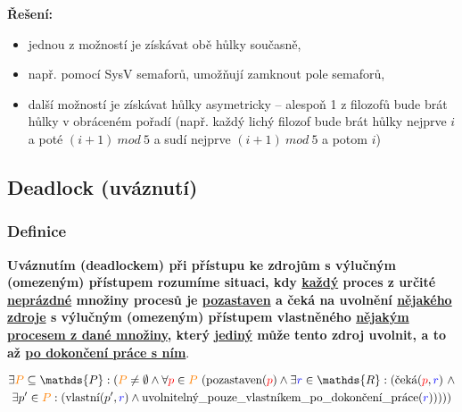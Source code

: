 \documentclass[a4paper, 11pt]{article}
\begin{document}
\textbf{Řešení:}
\begin{itemize}
    \item jednou z možností je získávat obě hůlky současně,
    \item např. pomocí SysV semaforů, umožňují zamknout pole semaforů,
    \item další možností je získávat hůlky asymetricky -- alespoň 1 z filozofů bude brát hůlky v obráceném pořadí (např. každý lichý filozof bude brát hůlky nejprve $i$ a poté $(i+1)\ mod\ 5$ a sudí nejprve $(i+1)\ mod\ 5$ a potom $i$)
\end{itemize}

\subsection{Deadlock (uváznutí)} \label{deadlock}
\subsubsection{Definice}
\textbf{Uváznutím (deadlockem) při přístupu ke zdrojům s výlučným (omezeným) přístupem rozumíme situaci, kdy \underline{každý} proces z určité \underline{neprázdné} množiny procesů je \underline{pozastaven} a čeká na uvolnění \underline{nějakého zdroje} s výlučným (omezeným) přístupem vlastněného \underline{nějakým procesem z dané množiny}, který \underline{jediný} může tento zdroj uvolnit, a to až \underline{po dokončení práce s ním}}.\vspace*{-1.5em}

\begin{multline*}
  \exists \textcolor{orange}{P} \subseteq \mathds{P} : (\textcolor{orange}{P} \neq \emptyset \wedge \forall \textcolor{red}{p} \in \textcolor{orange}{P}\ (\text{pozastaven}(\textcolor{red}{p}) \wedge \exists \textcolor{blue}{r} \in \mathds{R} : (\text{čeká}(\textcolor{red}{p}, \textcolor{blue}{r})\ \wedge \\ \exists p' \in \textcolor{orange}{P} : (\text{vlastní}(p', \textcolor{blue}{r}) \wedge \text{uvolnitelný\_pouze\_vlastníkem\_po\_dokončení\_práce}(\textcolor{blue}{r})))))
\end{multline*}
\end{document}
